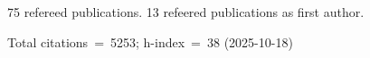 75 refereed publications. 13 refeered publications as first author.

Total citations~=~5253; h-index~=~38 (2025-10-18)